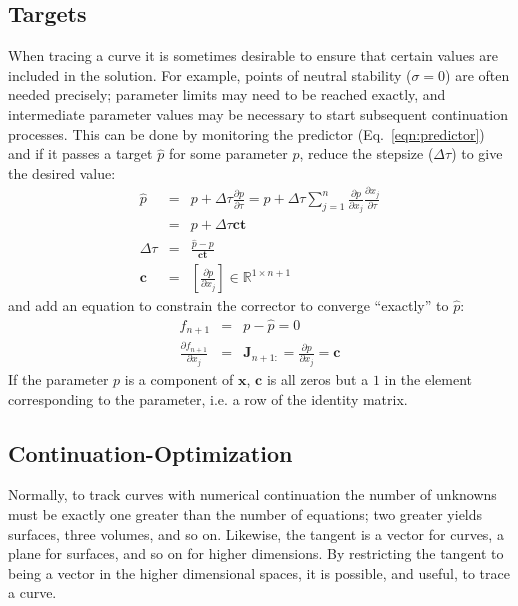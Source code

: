 \documentclass[11pt,openany,twoside]{book}
\numberwithin{equation}{section}		%
\newcommand{\Matrix}[1]{\boldsymbol{#1}}
\newcommand{\Vector}[1]{\boldsymbol{#1}}
\newcommand{\Step}{\Delta\tau}
\newcommand{\Eqn}[1]{Eq.\ \ref{#1}}  %
\begin{document}
\subsection{Targets}\label{sect:targets}
When tracing a curve it is sometimes desirable to ensure that
certain values are included in the solution.
For example,
points of neutral stability ($\sigma = 0$) are often needed precisely;
parameter limits may need to be reached exactly, and intermediate
parameter values may be necessary to start subsequent continuation processes.
This can be done by monitoring the predictor (\Eqn{eqn:predictor}) and
if it passes a target $\hat{p}$ for some parameter $p$, reduce the stepsize
($\Step$) to give the desired value:
\begin{eqnarray}
\hat{p} & = & p + \Step \frac{\partial p}{\partial \tau}
	= p + \Step\sum_{j=1}^n \frac{\partial p}{\partial x_j}\frac{\partial x_j}{\partial \tau} \nonumber \\
	& = & p + \Step \Vector{c} \Vector{t}  \nonumber \\
\Step & = & \frac{\hat{p} - p}{\Vector{c}\Vector{t}} \nonumber \\
\Vector{c} & = & \left[ \frac{\partial p}{\partial x_j} \right] 
\in \mathbb{R}^{1 \times n+1}
\end{eqnarray}
and add an equation to constrain the corrector to converge ``exactly''
to $\hat{p}$:
\begin{eqnarray}
f_{n+1} & = & p - \hat{p} = 0  \nonumber \\
\frac{\partial f_{n+1}}{\partial x_j} & = & \Matrix{J}_{n+1:} = \frac{\partial p}{\partial x_j}
	= \Vector{c}
\end{eqnarray}
If the parameter $p$ is a component of $\Vector{x}$, $\Vector{c}$ is all zeros
but a $1$ in the element corresponding to the parameter, i.e. a row of the identity matrix.


\subsection{Continuation-Optimization}\label{sect:optim}
Normally, to track curves with numerical continuation the number of unknowns
must be exactly one greater than the number of equations; two greater
yields surfaces, three volumes, and so on. Likewise, the tangent is a
vector for curves, a plane for surfaces, and so on for higher dimensions.
By restricting the tangent to being a vector in the higher dimensional
spaces, it is possible, and useful, to trace a curve.
\end{document}
